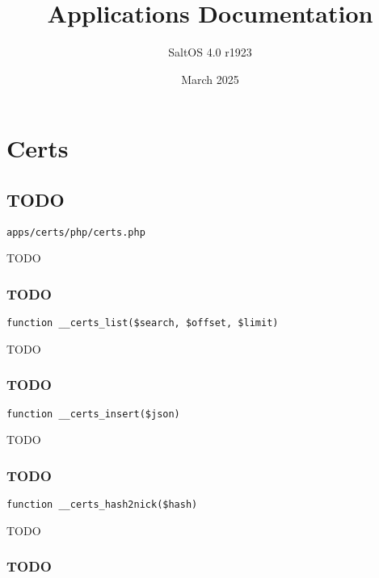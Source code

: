 \documentclass[a4paper]{article}
\title{Applications Documentation}
\author{SaltOS 4.0 r1923}
\begin{document}
\date{March 2025}
\maketitle
\clearpage

\tableofcontents
\clearpage


\hypertarget{toc1}{}
\section{Certs}

\hypertarget{toc2}{}
\subsection{TODO}

\begin{lstlisting}
apps/certs/php/certs.php
\end{lstlisting}

TODO

\hypertarget{toc3}{}
\subsubsection{TODO}

\begin{lstlisting}
function __certs_list($search, $offset, $limit)
\end{lstlisting}

TODO

\hypertarget{toc4}{}
\subsubsection{TODO}

\begin{lstlisting}
function __certs_insert($json)
\end{lstlisting}

TODO

\hypertarget{toc5}{}
\subsubsection{TODO}

\begin{lstlisting}
function __certs_hash2nick($hash)
\end{lstlisting}

TODO

\hypertarget{toc6}{}
\subsubsection{TODO}
\end{document}
